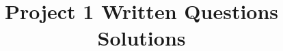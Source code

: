 %
%
%
%
%
%
%
%
%
%
%
%
%

\documentclass[11pt]{article}

\usepackage[english]{babel}
\usepackage[utf8]{inputenc}
\usepackage{amssymb}
\usepackage{xcolor}
\usepackage[colorlinks = true,
            linkcolor = blue,
            urlcolor  = blue]{hyperref}
\usepackage[a4paper,margin=1.5in]{geometry}
\usepackage{stackengine,graphicx}
\usepackage{fancyhdr}
\setlength{\headheight}{15pt}
\usepackage{microtype}
\usepackage{times}
\usepackage[shortlabels]{enumitem}
\usepackage{amsmath}

\usepackage{pythonhighlight}

\frenchspacing
\setlength{\parindent}{0cm} %
\setlength{\parskip}{0.3cm plus1mm minus1mm}

\pagestyle{fancy}
\fancyhf{}
\rfoot{\thepage}

\date{}

\title{\vspace{-1cm}Project 1 Written Questions Solutions}



